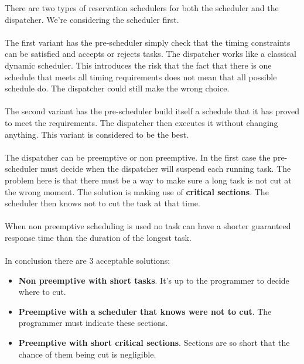 \documentclass[../main.tex]{subfiles}
\begin{document}
There are two types of reservation schedulers for both the scheduler and the dispatcher. We're considering the scheduler first.\\\\
The first variant has the pre-scheduler simply check that the timing constraints can be satisfied and accepts or rejects tasks. The dispatcher works like a classical dynamic scheduler. This introduces the risk that the fact that there is one schedule that meets all timing requirements does not mean that all possible schedule do. The dispatcher could still make the wrong choice.
\\\\
The second variant has the pre-scheduler build itself a schedule that it has proved to meet the requirements. The dispatcher then executes it without changing anything. This variant is considered to be the best.
\\\\
The dispatcher can be preemptive or non preemptive. In the first case the pre-scheduler must decide when the dispatcher will suspend each running task. The problem here is that there must be a way to make sure a long task is not cut at the wrong moment. The solution is making use of \textbf{critical sections}. The scheduler then knows not to cut the task at that time.
\\\\
When non preemptive scheduling is used no task can have a shorter guaranteed response time than the duration of the longest task.
\\\\
In conclusion there are 3 acceptable solutions:
\begin{itemize}
	\item \textbf{Non preemptive with short tasks}. It's up to the programmer to decide where to cut.
	\item \textbf{Preemptive with a scheduler that knows were not to cut}. The programmer must indicate these sections.
	\item \textbf{Preemptive with short critical sections}. Sections are so short that the chance of them being cut is negligible.
\end{itemize}
\end{document}
